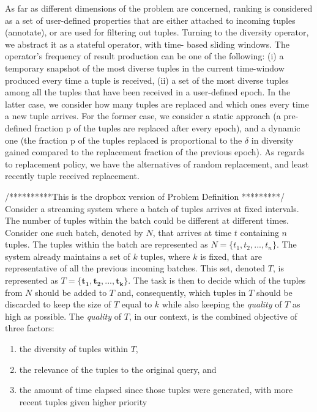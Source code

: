 As far as different dimensions of the problem are concerned, ranking is
considered as a set of user-defined properties that are either attached to
incoming tuples (annotate), or are used for filtering out tuples. Turning
to the diversity operator, we abstract it as a stateful operator, with time-
based sliding windows. The operator's frequency of result production
can be one of the following: (i) a temporary snapshot of the most diverse
tuples in the current time-window produced every time a tuple is received,
(ii) a set of the most diverse tuples among all the tuples that have been
received in a user-defined epoch. In the latter case, we consider how
many tuples are replaced and which ones every time a new tuple arrives.
For the former case, we consider a static approach (a pre-defined fraction
p of the tuples are replaced after every epoch), and a dynamic one (the
fraction p of the tuples replaced is proportional to the $\delta$ in diversity gained
compared to the replacement fraction of the previous epoch). As regards
to replacement policy, we have the alternatives of random replacement,
and least recently tuple received replacement.


/**********This is the dropbox version of Problem Definition *********/
Consider a streaming system where a batch of tuples arrives at fixed intervals. The number of tuples within the batch could be different at different times. Consider one such batch, denoted by $N$, that arrives at time $t$ containing $n$  tuples. The tuples within the batch are represented as $N=\{t_1,t_2,...,t_n\}$. The system already maintains a set of $k$ tuples, where $k$ is fixed, that are representative of all the previous incoming batches. This set, denoted $T$, is represented as $T=\{\mathbf{t_1},\mathbf{t_2},...,\mathbf{t_k}\}$. The task is then to decide which of the tuples from $N$ should be  added to $T$ and, consequently, which tuples in $T$ should be discarded to keep the size of $T$ equal to $k$ while also keeping the \textit{quality} of $T$ as high as possible. The \textit{quality} of $T$, in our context, is the combined objective of three factors:
\begin{enumerate}
\item the diversity of tuples within $T$, 
\item the relevance of the tuples to the original query, and 
\item the amount of time elapsed since those tuples were generated, with more recent tuples given higher priority
\end{enumerate}